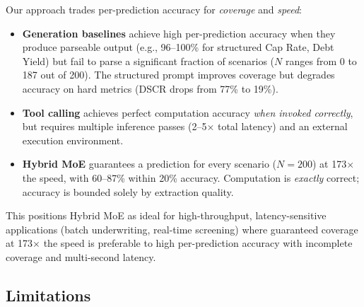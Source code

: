 Our approach trades per-prediction accuracy for \emph{coverage} and
\emph{speed}:

\begin{itemize}
\item \textbf{Generation baselines} achieve high per-prediction accuracy
when they produce parseable output (e.g., 96--100\% for structured
Cap Rate, Debt Yield) but fail to parse a significant fraction of
scenarios ($N$ ranges from 0 to 187 out of 200). The structured prompt
improves coverage but degrades accuracy on hard metrics (DSCR drops
from 77\% to 19\%).
\item \textbf{Tool calling} achieves perfect computation accuracy
\emph{when invoked correctly}, but requires multiple inference passes
(2--5$\times$ total latency) and an external execution environment.
\item \textbf{Hybrid MoE} guarantees a prediction for every scenario
($N{=}200$) at 173$\times$ the speed, with 60--87\% within 20\%
accuracy. Computation is \emph{exactly} correct; accuracy is bounded
solely by extraction quality.
\end{itemize}

This positions Hybrid MoE as ideal for high-throughput, latency-sensitive
applications (batch underwriting, real-time screening) where guaranteed
coverage at 173$\times$ the speed is preferable to high per-prediction
accuracy with incomplete coverage and multi-second latency.

\subsection{Limitations}
\label{sec:analysis:limitations}

